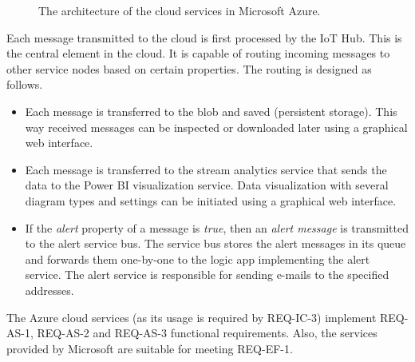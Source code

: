 \documentclass[a4paper, 11pt]{article}
\begin{document}
	\begin{figure}[h!]
		\center
		\caption{The architecture of the cloud services in Microsoft Azure.}
		\label{fig:azure-cloud}
	\end{figure}
	
	Each message transmitted to the cloud is first processed by the IoT Hub. This is the central element in the cloud. It is 	capable of routing incoming messages to other service nodes based on certain properties. The routing is designed as follows.
	 \begin{itemize}
	 	\item Each message is transferred to the blob and saved (persistent storage). This way received messages can be inspected or downloaded later using a graphical web interface.
		\item Each message is transferred to the stream analytics service that sends the data to the Power BI visualization service. Data visualization with several diagram types and settings can be initiated using a graphical web interface. 
	 	\item If the \textsl{alert} property of a message is \textsl{true}, then an \emph{alert message} is transmitted to the alert service bus. The service bus stores the alert messages in its queue and forwards them one-by-one to the logic app implementing the alert service. The alert service is responsible for sending e-mails to the specified addresses.
	 \end{itemize}
 
 	The Azure cloud services (as its usage is required by REQ-IC-3) implement REQ-AS-1, REQ-AS-2 and REQ-AS-3 functional requirements. Also, the services provided by Microsoft are suitable for meeting REQ-EF-1. 
	
\end{document}

